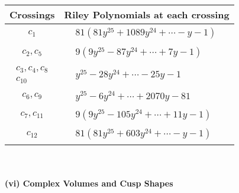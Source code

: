 \documentclass[1p]{elsarticle_modified}
\theoremstyle{definition}
\begin{document}
\begin{tabular}{m{50pt}|m{274pt}}
Crossings & \hspace{64pt}Riley Polynomials at each crossing \\
\hline $$\begin{aligned}c_{1}\end{aligned}$$&$\begin{aligned}
&81(81 y^{25}+1089 y^{24}+\cdots- y-1)
\end{aligned}$\\
\hline $$\begin{aligned}c_{2},c_{5}\end{aligned}$$&$\begin{aligned}
&9(9 y^{25}-87 y^{24}+\cdots+7 y-1)
\end{aligned}$\\
\hline $$\begin{aligned}c_{3},c_{4},c_{8}\\c_{10}\end{aligned}$$&$\begin{aligned}
&y^{25}-28 y^{24}+\cdots-25 y-1
\end{aligned}$\\
\hline $$\begin{aligned}c_{6},c_{9}\end{aligned}$$&$\begin{aligned}
&y^{25}-6 y^{24}+\cdots+2070 y-81
\end{aligned}$\\
\hline $$\begin{aligned}c_{7},c_{11}\end{aligned}$$&$\begin{aligned}
&9(9 y^{25}-105 y^{24}+\cdots+11 y-1)
\end{aligned}$\\
\hline $$\begin{aligned}c_{12}\end{aligned}$$&$\begin{aligned}
&81(81 y^{25}+603 y^{24}+\cdots- y-1)
\end{aligned}$\\
\hline
\end{tabular}\\~\\
\newpage\flushleft \textbf{(vi) Complex Volumes and Cusp Shapes}
\end{document}
